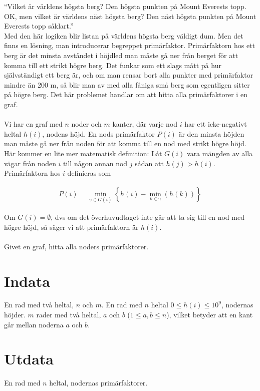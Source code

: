 
\def\version{1}

“Vilket är världens högsta berg? Den högsta punkten på Mount Everests topp. OK, men vilket är världens näst högsta berg? Den näst högsta punkten på Mount Everests topp såklart.”\\
Med den här logiken blir listan på världens högsta berg väldigt dum. Men det finns en lösning, man introducerar begreppet primärfaktor. Primärfaktorn hos ett berg är det minsta avståndet i höjdled man måste gå ner från berget för att komma till ett strikt högre berg. Det funkar som ett slags mått på hur självständigt ett berg är, och om man rensar bort alla punkter med primärfaktor mindre än 200 m, så blir man av med alla fåniga små berg som egentligen sitter på högre berg. Det här problemet handlar om att hitta alla primärfaktorer i en graf.
\\\\
Vi har en graf med $n$ noder och $m$ kanter, där varje nod $i$ har ett icke-negativt heltal $h(i)$, nodens höjd. En nods primärfaktor $P(i)$ är den minsta höjden man måste gå ner från noden för att komma till en nod med strikt högre höjd. Här kommer en lite mer matematisk definition:
Låt $G(i)$ vara mängden av alla vägar från noden $i$ till någon annan nod $j$ sådan att $h(j) > h(i)$. Primärfaktorn hos $i$ definieras som 

\begin{align*} 
P(i) =  \min_{\gamma \in G(i)}  \left\{   h(i) - \min_{k\in \gamma}(h(k))  \right\}
\end{align*} 

Om $G(i) = \emptyset$, dvs om det överhuvudtaget inte går att ta sig till en nod med högre höjd, så säger vi att primärfaktorn är $h(i)$. \\\\
Givet en graf, hitta alla noders primärfaktorer.

\section*{Indata}
En rad med två heltal, $n$ och $m$. En rad med $n$ heltal $0 \leq h(i) \leq 10^9$, nodernas höjder. $m$ rader med två heltal, $a$ och $b$ ($1 \leq a,b \leq n$), vilket betyder att en kant går mellan noderna $a$ och $b$.

\section*{Utdata}
En rad med $n$ heltal, nodernas primärfaktorer.

